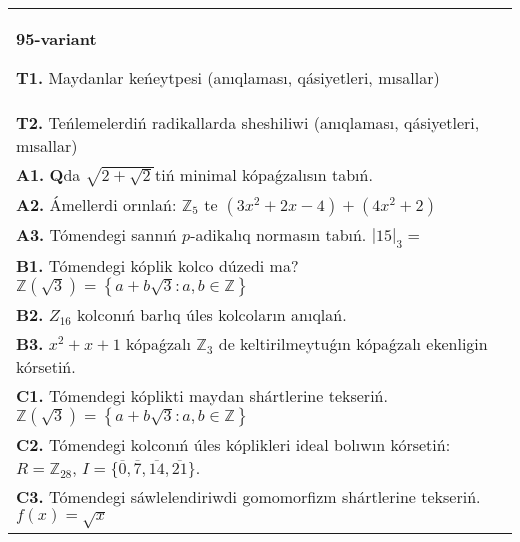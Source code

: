 \documentclass{article}
\begin{document}
\begin{tabular}{m{17cm}}
\textbf{95-variant}
\newline

\textbf{T1.} Maydanlar keńeytpesi (anıqlaması, qásiyetleri, mısallar) \\
\textbf{T2.} Teńlemelerdiń radikallarda sheshiliwi (anıqlaması, qásiyetleri, mısallar) \\
\textbf{A1.} \(\mathbf{Q}\)da \(\sqrt{2 + \sqrt{2}}\)tiń minimal kópaǵzalısın tabıń. \\
\textbf{A2.} Ámellerdi orınlań: \(\mathbb{Z}_{5}\) te \(\left( 3x^{2} + 2x - 4 \right) + \left( 4x^{2} + 2 \right)\) \\
\textbf{A3.} Tómendegi sannıń \(p\)-adikalıq normasın tabıń. \(|15|_{3} =\) \\
\textbf{B1.} Tómendegi kóplik kolco dúzedi ma? \(\mathbb{Z}\left( \sqrt{3} \right) = \left\{ a + b\sqrt{3}:a,b \in \mathbb{Z} \right\}\) \\
\textbf{B2.} \(Z_{16}\) kolconıń barlıq úles kolcoların anıqlań. \\
\textbf{B3.} \(x^{2} + x + 1\) kópaǵzalı \(\mathbb{Z}_{3}\) de keltirilmeytuǵın kópaǵzalı ekenligin kórsetiń. \\
\textbf{C1.} Tómendegi kóplikti maydan shártlerine tekseriń. \(\mathbb{Z}\left( \sqrt{3} \right) = \left\{ a + b\sqrt{3}:a,b \in \mathbb{Z} \right\}\) \\
\textbf{C2.} Tómendegi kolconıń úles kóplikleri ideal bolıwın kórsetiń:
\(R = \mathbb{Z}_{28}\), \(I = \{\overline{0},\overline{7},\overline{14},\overline{21}\}\). \\
\textbf{C3.} Tómendegi sáwlelendiriwdi gomomorfizm shártlerine tekseriń. \(f(x) = \sqrt{x}\) \\

\end{tabular}
\vspace{1cm}
\end{document}
